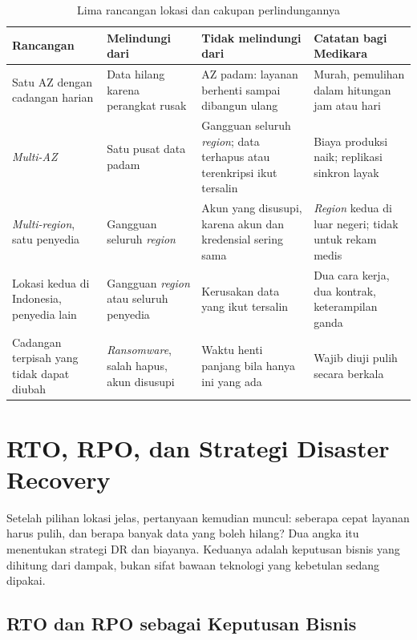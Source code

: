\begin{table}[!htb]
  \centering
  \caption{Lima rancangan lokasi dan cakupan perlindungannya}
  \label{tab:ch12-cakupan}
  \footnotesize
  \begin{tabularx}{\textwidth}{>{\raggedright\arraybackslash}p{2.5cm} >{\raggedright\arraybackslash}X >{\raggedright\arraybackslash}X >{\raggedright\arraybackslash}X}
    \hline
    \textbf{Rancangan} & \textbf{Melindungi dari} & \textbf{Tidak melindungi dari} &
      \textbf{Catatan bagi Medikara} \\ \hline
    Satu AZ dengan cadangan harian & Data hilang karena perangkat rusak & AZ padam: layanan
      berhenti sampai dibangun ulang & Murah, pemulihan dalam hitungan jam atau hari \\ \hline
    \textit{Multi-AZ} & Satu pusat data padam & Gangguan seluruh \textit{region}; data terhapus
      atau terenkripsi ikut tersalin & Biaya produksi naik; replikasi sinkron layak \\ \hline
    \textit{Multi-region}, satu penyedia & Gangguan seluruh \textit{region} & Akun yang disusupi,
      karena akun dan kredensial sering sama & \textit{Region} kedua di luar negeri; tidak untuk
      rekam medis \\ \hline
    Lokasi kedua di Indonesia, penyedia lain & Gangguan \textit{region} atau seluruh penyedia &
      Kerusakan data yang ikut tersalin & Dua cara kerja, dua kontrak, keterampilan ganda \\
      \hline
    Cadangan terpisah yang tidak dapat diubah & \textit{Ransomware}, salah hapus, akun disusupi
      & Waktu henti panjang bila hanya ini yang ada & Wajib diuji pulih secara berkala \\ \hline
  \end{tabularx}
\end{table}

\section{RTO, RPO, dan Strategi Disaster Recovery}
\label{sec:ch12-rto-rpo}

Setelah pilihan lokasi jelas, pertanyaan kemudian muncul: seberapa cepat layanan harus pulih, dan
berapa banyak data yang boleh hilang? Dua angka itu menentukan strategi DR dan biayanya. Keduanya
adalah keputusan bisnis yang dihitung dari dampak, bukan sifat bawaan teknologi yang kebetulan
sedang dipakai.

\subsection{RTO dan RPO sebagai Keputusan Bisnis}

